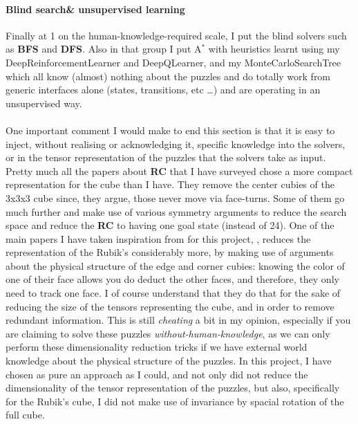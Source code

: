 \paragraph{Blind search\& unsupervised learning}
Finally at 1 on the human-knowledge-required scale, I put the blind solvers such as \textbf{BFS} and \textbf{DFS}. Also in that group I put A$^{*}$ with heuristics learnt using my DeepReinforcementLearner and DeepQLearner, and my MonteCarloSearchTree which all know (almost) nothing about the puzzles and do totally work from generic interfaces alone (states, transitions, etc \dots) and are operating in an unsupervised way.
\\
\\
One important comment I would make to end this section is that it is easy to inject, without realising or acknowledging it, specific knowledge into the solvers, or in the tensor representation of the puzzles that the solvers take as input. Pretty much all the papers about \textbf{RC} that I have surveyed chose a more compact representation for the cube than I have. They remove the center cubies of the 3x3x3 cube since, they argue, those never move via face-turns. Some of them go much further and make use of various symmetry arguments to reduce the search space and reduce the \textbf{RC} to having one goal state (instead of 24). One of the main papers I have taken inspiration from for this project, \cite{DBLP:journals/corr/abs-1805-07470}, reduces the representation of the Rubik's considerably more, by making use of arguments about the physical structure of the edge and corner cubies: knowing the color of one of their face allows you do deduct the other faces, and therefore, they only need to track one face. I of course understand that they do that for the sake of reducing the size of the tensors representing the cube, and in order to remove redundant information. This is still \textit{cheating} a bit in my opinion, especially if you are claiming to solve these puzzles \textit{without-human-knowledge}, as we can only perform these dimensionality reduction tricks if we have external world knowledge about the physical structure of the puzzles. In this project, I have chosen as pure an approach as I could, and not only did not reduce the dimensionality of the tensor representation of the puzzles, but also, specifically for the Rubik's cube, I did not make use of invariance by spacial rotation of the full cube.



































